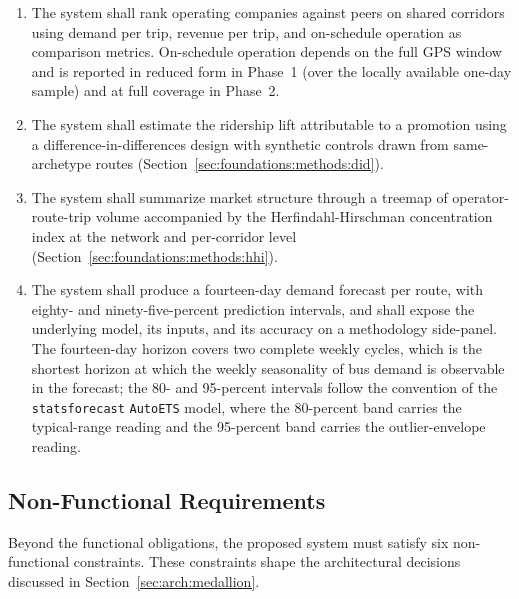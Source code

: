 \begin{enumerate}
  \item[\textbf{R12.}] The system shall rank operating companies against peers on shared corridors using demand per trip, revenue per trip, and on-schedule operation as comparison metrics. On-schedule operation depends on the full GPS window and is reported in reduced form in Phase~1 (over the locally available one-day sample) and at full coverage in Phase~2.
  \item[\textbf{R13.}] The system shall estimate the ridership lift attributable to a promotion using a difference-in-differences design \cite{abadie2005did} with synthetic controls drawn from same-archetype routes (Section~\ref{sec:foundations:methods:did}).
  \item[\textbf{R14.}] The system shall summarize market structure through a treemap of operator-route-trip volume accompanied by the Herfindahl-Hirschman concentration index \cite{rhoades1993herfindahl} at the network and per-corridor level (Section~\ref{sec:foundations:methods:hhi}).
  \item[\textbf{R15.}] The system shall produce a fourteen-day demand forecast per route, with eighty- and ninety-five-percent prediction intervals, and shall expose the underlying model, its inputs, and its accuracy on a methodology side-panel. The fourteen-day horizon covers two complete weekly cycles, which is the shortest horizon at which the weekly seasonality of bus demand is observable in the forecast; the 80- and 95-percent intervals follow the convention of the \texttt{statsforecast} \cite{statsforecast} \texttt{AutoETS} model, where the 80-percent band carries the typical-range reading and the 95-percent band carries the outlier-envelope reading.
\end{enumerate}

\subsection{Non-Functional Requirements}
\label{sec:solution:problem:nonfunctional}

Beyond the functional obligations, the proposed system must satisfy six
non-functional constraints. These constraints shape the architectural
decisions discussed in Section~\ref{sec:arch:medallion}.

